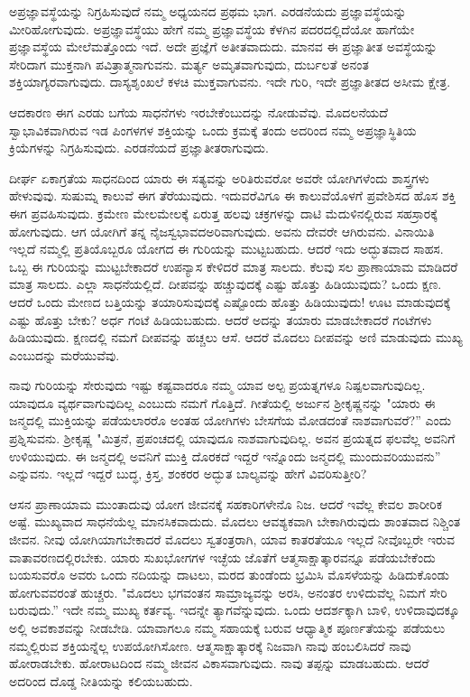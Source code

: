 ಅಪ್ರಜ್ಞಾವಸ್ಥೆಯನ್ನು ನಿಗ್ರಹಿಸುವುದೆ ನಮ್ಮ ಅಧ್ಯಯನದ ಪ್ರಥಮ ಭಾಗ. ಎರಡನೆಯದು ಪ್ರಜ್ಞಾವಸ್ಥೆಯನ್ನು ಮೀರಿಹೋಗುವುದು. ಅಪ್ರಜ್ಞಾವಸ್ಥೆಯು ಹೇಗೆ ನಮ್ಮ ಪ್ರಜ್ಞಾವಸ್ಥೆಯ ಕೆಳಗಿನ ಪದರದಲ್ಲಿದೆಯೋ ಹಾಗೆಯೇ ಪ್ರಜ್ಞಾವಸ್ಥೆಯ ಮೇಲೆ\break ಮತ್ತೊಂದು ಇದೆ. ಅದೇ ಪ್ರಜ್ಞೆಗೆ ಅತೀತವಾದುದು. ಮಾನವ ಈ ಪ್ರಜ್ಞಾತೀತ ಅವಸ್ಥೆಯನ್ನು ಸೇರಿದಾಗ ಮುಕ್ತನಾಗಿ ಪವಿತ್ರಾತ್ಮನಾಗುವನು. ಮರ್ತ್ಯ ಅಮೃತವಾಗುವುದು, ದುರ್ಬಲತೆ ಅನಂತ ಶಕ್ತಿಯಾಗ್ಯರವಾಗುವುದು. ದಾಸ್ಯಶೃಂಖಲೆ ಕಳಚಿ ಮುಕ್ತವಾಗುವನು. ಇದೇ ಗುರಿ, ಇದೇ ಪ್ರಜ್ಞಾತೀತದ ಅಸೀಮ ಕ್ಷೇತ್ರ.

ಆದಕಾರಣ ಈಗ ಎರಡು ಬಗೆಯ ಸಾಧನೆಗಳು ಇರಬೇಕೆಂಬುದನ್ನು ನೋಡುವೆವು. ಮೊದಲನೆಯದೆ ಸ್ವಾಭಾವಿಕವಾಗಿರುವ ಇಡ ಪಿಂಗಳಗಳ ಶಕ್ತಿಯನ್ನು ಒಂದು ಕ್ರಮಕ್ಕೆ ತಂದು ಅದರಿಂದ ನಮ್ಮ ಅಪ್ರಜ್ಞಾಸ್ಥಿತಿಯ ಕ್ರಿಯೆಗಳನ್ನು ನಿಗ್ರಹಿಸುವುದು. ಎರಡನೆಯದೆ ಪ್ರಜ್ಞಾತೀತರಾಗುವುದು.

ದೀರ್ಘ ಏಕಾಗ್ರತೆಯ ಸಾಧನದಿಂದ ಯಾರು ಈ ಸತ್ಯವನ್ನು ಅರಿತಿರುವರೋ ಅವರೇ ಯೋಗಿಗಳೆಂದು ಶಾಸ್ತ್ರಗಳು ಹೇಳುವುವು. ಸುಷುಮ್ನ ಕಾಲುವೆ ಈಗ ತೆರೆಯುವುದು. ಇದುವರೆವಿಗೂ ಈ ಕಾಲುವೆಯೊಳಗೆ ಪ್ರವೇಶಿಸದ ಹೊಸ ಶಕ್ತಿ ಈಗ ಪ್ರವಹಿಸುವುದು. ಕ್ರಮೇಣ ಮೇಲಮೇಲಕ್ಕೆ ಏರುತ್ತ ಹಲವು ಚಕ್ರಗಳನ್ನು ದಾಟಿ ಮೆದುಳಿನಲ್ಲಿರುವ ಸಹಸ್ರಾರಕ್ಕೆ ಹೋಗುವುದು. ಆಗ ಯೋಗಿಗೆ ತನ್ನ ನೈಜಸ್ವಭಾವದ\break ಅರಿವಾಗುವುದು. ಅವನು ದೇವರೇ ಆಗಿರುವನು. ವಿನಾಯಿತಿ ಇಲ್ಲದೆ ನಮ್ಮಲ್ಲಿ ಪ್ರತಿಯೊಬ್ಬರೂ ಯೋಗದ ಈ ಗುರಿಯನ್ನು ಮುಟ್ಟಬಹುದು. ಆದರೆ ಇದು ಅದ್ಭುತವಾದ ಸಾಹಸ. ಒಬ್ಬ ಈ ಗುರಿಯನ್ನು ಮುಟ್ಟಬೇಕಾದರೆ ಉಪನ್ಯಾಸ ಕೇಳಿದರೆ ಮಾತ್ರ ಸಾಲದು. ಕೆಲವು ಸಲ ಪ್ರಾಣಾಯಾಮ ಮಾಡಿದರೆ ಮಾತ್ರ ಸಾಲದು. ಎಲ್ಲಾ ಸಾಧನೆಯಲ್ಲಿದೆ. ದೀಪವನ್ನು ಹಚ್ಚುವುದಕ್ಕೆ ಎಷ್ಟು ಹೊತ್ತು ಹಿಡಿಯುವುದು? ಒಂದು ಕ್ಷಣ. ಆದರೆ ಒಂದು ಮೇಣದ ಬತ್ತಿಯನ್ನು ತಯಾರಿಸುವುದಕ್ಕೆ ಎಷ್ಟೊಂದು ಹೊತ್ತು ಹಿಡಿಯುವುದು! ಊಟ ಮಾಡುವುದಕ್ಕೆ ಎಷ್ಟು ಹೊತ್ತು ಬೇಕು? ಅರ್ಧ ಗಂಟೆ ಹಿಡಿಯಬಹುದು. ಆದರೆ ಅದನ್ನು ತಯಾರು ಮಾಡಬೇಕಾದರೆ ಗಂಟೆಗಳು ಹಿಡಿಯುವುದು. ಕ್ಷಣದಲ್ಲಿ ನಮಗೆ ದೀಪವನ್ನು ಹಚ್ಚಲು ಆಸೆ. ಆದರೆ ಮೊದಲು ದೀಪವನ್ನು ಅಣಿ ಮಾಡುವುದು ಮುಖ್ಯ ಎಂಬುದನ್ನು ಮರೆಯುವೆವು.

ನಾವು ಗುರಿಯನ್ನು ಸೇರುವುದು ಇಷ್ಟು ಕಷ್ಟವಾದರೂ ನಮ್ಮ ಯಾವ ಅಲ್ಪ ಪ್ರಯತ್ನಗಳೂ ನಿಷ್ಪಲವಾಗುವುದಿಲ್ಲ. ಯಾವುದೂ ವ್ಯರ್ಥವಾಗುವುದಿಲ್ಲ ಎಂಬುದು ನಮಗೆ ಗೊತ್ತಿದೆ. ಗೀತೆಯಲ್ಲಿ ಅರ್ಜುನ ಶ‍್ರೀಕೃಷ್ಣನನ್ನು "ಯಾರು ಈ ಜನ್ಮದಲ್ಲಿ ಮುಕ್ತಿಯನ್ನು ಪಡೆಯಲಾರರೊ ಅಂತಹ ಯೋಗಿಗಳು ಬೇಸಗೆಯ ಮೋಡದಂತೆ ನಾಶವಾಗುವರೆ?'' ಎಂದು ಪ್ರಶ್ನಿಸುವನು. ಶ‍್ರೀಕೃಷ್ಣ "ಮಿತ್ರನೆ, ಪ್ರಪಂಚದಲ್ಲಿ ಯಾವುದೂ ನಾಶವಾಗುವುದಿಲ್ಲ. ಅವನ ಪ್ರಯತ್ನದ ಫಲವೆಲ್ಲ ಅವನಿಗೆ ಉಳಿಯುವುದು. ಈ ಜನ್ಮದಲ್ಲಿ ಅವನಿಗೆ ಮುಕ್ತಿ ದೊರಕದೆ ಇದ್ದರೆ ಇನ್ನೊಂದು ಜನ್ಮದಲ್ಲಿ ಮುಂದುವರಿಯುವನು” ಎನ್ನುವನು. ಇಲ್ಲದೆ ಇದ್ದರೆ ಬುದ್ಧ, ಕ್ರಿಸ್ತ, ಶಂಕರರ ಅದ್ಭುತ ಬಾಲ್ಯವನ್ನು ಹೇಗೆ ವಿವರಿಸುತ್ತೀರಿ?

ಆಸನ ಪ್ರಾಣಾಯಾಮ ಮುಂತಾದುವು ಯೋಗ ಜೀವನಕ್ಕೆ ಸಹಕಾರಿಗಳೇನೊ ನಿಜ. ಆದರೆ ಇವೆಲ್ಲ ಕೇವಲ ಶಾರೀರಿಕ ಅಷ್ಟೆ. ಮುಖ್ಯವಾದ ಸಾಧನೆಯೆಲ್ಲ ಮಾನಸಿಕವಾದುದು. ಮೊದಲು ಆವಶ್ಯಕವಾಗಿ ಬೇಕಾಗಿರುವುದು ಶಾಂತವಾದ ನಿಶ್ಚಿಂತ ಜೀವನ. ನೀವು ಯೋಗಿಯಾಗಬೇಕಾದರೆ ಮೊದಲು ಸ್ವತಂತ್ರರಾಗಿ, ಯಾವ ಕಾತರತೆಯೂ ಇಲ್ಲದೆ ನೀವೊಬ್ಬರೇ ಇರುವ ವಾತಾವರಣದಲ್ಲಿರಬೇಕು. ಯಾರು ಸುಖಭೋಗಗಳ ಇಚ್ಛೆಯ ಜೊತೆಗೆ ಆತ್ಮಸಾಕ್ಷಾತ್ಕಾರವನ್ನೂ ಪಡೆಯಬೇಕೆಂದು ಬಯಸುವರೊ ಅವರು ಒಂದು ನದಿಯನ್ನು ದಾಟಲು, ಮರದ ತುಂಡೆಂದು ಭ್ರಮಿಸಿ ಮೊಸಳೆಯನ್ನು ಹಿಡಿದುಕೊಂಡು ಹೋಗುವವರಂತೆ ಹುಚ್ಚರು. "ಮೊದಲು ಭಗವಂತನ ಸಾಮ್ರಾಜ್ಯವನ್ನು ಅರಸಿ, ಅನಂತರ ಉಳಿದುವೆಲ್ಲ ನಿಮಗೆ ಸೇರಿ ಬರುವುದು.'' ಇದೇ ನಮ್ಮ ಮುಖ್ಯ ಕರ್ತವ್ಯ. ಇದನ್ನೇ ತ್ಯಾಗವೆನ್ನುವುದು. ಒಂದು ಆದರ್ಶಕ್ಕಾಗಿ ಬಾಳಿ, ಉಳಿದಾವುದಕ್ಕೂ ಅಲ್ಲಿ ಅವಕಾಶವನ್ನು ನೀಡಬೇಡಿ. ಯಾವಾಗಲೂ ನಮ್ಮ ಸಹಾಯಕ್ಕೆ ಬರುವ ಆಧ್ಯಾತ್ಮಿಕ ಪೂರ್ಣತೆಯನ್ನು ಪಡೆಯಲು ನಮ್ಮಲ್ಲಿರುವ ಶಕ್ತಿಯನ್ನೆಲ್ಲ ಉಪಯೋಗಿಸೋಣ. ಆತ್ಮಸಾಕ್ಷಾತ್ಕಾರಕ್ಕೆ ನಿಜವಾಗಿ ನಾವು ಹಂಬಲಿಸಿದರೆ ನಾವು ಹೋರಾಡಬೇಕು. ಹೋರಾಟದಿಂದ ನಮ್ಮ ಜೀವನ ವಿಕಾಸವಾಗುವುದು. ನಾವು ತಪ್ಪನ್ನು ಮಾಡಬಹುದು. ಆದರೆ ಅದರಿಂದ ದೊಡ್ಡ ನೀತಿಯನ್ನು ಕಲಿಯಬಹುದು.


